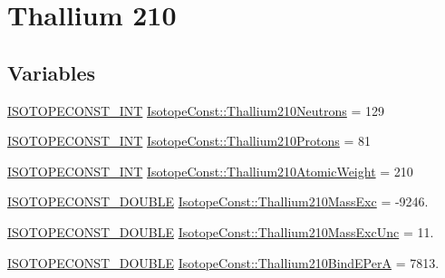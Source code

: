 \hypertarget{group___isotope_const-_thallium-_tl210}{}\section{Thallium 210}
\label{group___isotope_const-_thallium-_tl210}
\subsection*{Variables}
\begin{DoxyCompactItemize}
\item 
\mbox{\hyperlink{group___isotope_const-_macros_ga5f18360b3e99483a35c32d789e62621c}{I\+S\+O\+T\+O\+P\+E\+C\+O\+N\+S\+T\+\_\+\+I\+NT}} \mbox{\hyperlink{group___isotope_const-_thallium-_tl210_ga29b4529a50e5f78658888263b3ea63d9}{Isotope\+Const\+::\+Thallium210\+Neutrons}} = 129
\item 
\mbox{\hyperlink{group___isotope_const-_macros_ga5f18360b3e99483a35c32d789e62621c}{I\+S\+O\+T\+O\+P\+E\+C\+O\+N\+S\+T\+\_\+\+I\+NT}} \mbox{\hyperlink{group___isotope_const-_thallium-_tl210_ga946d06b3365b64c15dfaacda9b75e43f}{Isotope\+Const\+::\+Thallium210\+Protons}} = 81
\item 
\mbox{\hyperlink{group___isotope_const-_macros_ga5f18360b3e99483a35c32d789e62621c}{I\+S\+O\+T\+O\+P\+E\+C\+O\+N\+S\+T\+\_\+\+I\+NT}} \mbox{\hyperlink{group___isotope_const-_thallium-_tl210_gafd7a4af2fd06ba1ccf568a39a90049f4}{Isotope\+Const\+::\+Thallium210\+Atomic\+Weight}} = 210
\item 
\mbox{\hyperlink{group___isotope_const-_macros_ga8f45a7272ce02c0b4c65c44636ed719a}{I\+S\+O\+T\+O\+P\+E\+C\+O\+N\+S\+T\+\_\+\+D\+O\+U\+B\+LE}} \mbox{\hyperlink{group___isotope_const-_thallium-_tl210_gadbb91c5a22f5189b2138429a863b55f1}{Isotope\+Const\+::\+Thallium210\+Mass\+Exc}} = -\/9246.
\item 
\mbox{\hyperlink{group___isotope_const-_macros_ga8f45a7272ce02c0b4c65c44636ed719a}{I\+S\+O\+T\+O\+P\+E\+C\+O\+N\+S\+T\+\_\+\+D\+O\+U\+B\+LE}} \mbox{\hyperlink{group___isotope_const-_thallium-_tl210_ga0c54e71bf583fbac592037abc4c0d3fa}{Isotope\+Const\+::\+Thallium210\+Mass\+Exc\+Unc}} = 11.
\item 
\mbox{\hyperlink{group___isotope_const-_macros_ga8f45a7272ce02c0b4c65c44636ed719a}{I\+S\+O\+T\+O\+P\+E\+C\+O\+N\+S\+T\+\_\+\+D\+O\+U\+B\+LE}} \mbox{\hyperlink{group___isotope_const-_thallium-_tl210_gaae7b3dcfa08a300f4751c2c939244541}{Isotope\+Const\+::\+Thallium210\+Bind\+E\+PerA}} = 7813.
\item 

\end{DoxyCompactItemize}
